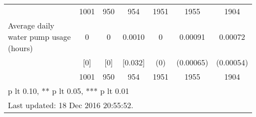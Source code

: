\begin{table}[htbp]
\begin{tabular*}{1\hsize}{@{\hskip\tabcolsep\extracolsep\fill}l*{1}{cccccc}}
                                &     1001&      950&      954&     1951         &     1955         &     1904         \\
Average daily water pump usage (hours)&        0&        0&   0.0010&        0         &  0.00091         &  0.00072         \\
                                &      [0]&      [0]&  [0.032]&      (0)         &(0.00065)         &(0.00054)         \\
                                &     1001&      950&      954&     1951         &     1955         &     1904         \\
\bottomrule
\multicolumn{7}{l}{\footnotesize * p lt 0.10, ** p lt 0.05, *** p lt 0.01}\\
\multicolumn{7}{l}{\footnotesize Last updated: 18 Dec 2016 20:55:52.}\\
\end{tabular*}
\end{table}
